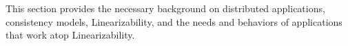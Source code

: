 This section provides the necessary background on distributed applications, consistency models, Linearizability, and the needs and behaviors of applications that work atop Linearizability.





